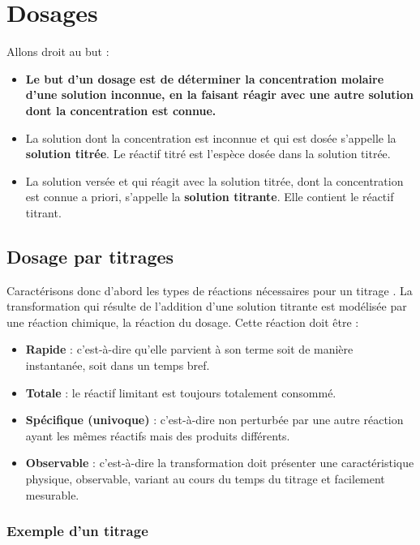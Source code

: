 \documentclass[11pt,a4paper]{article}
\begin{document}
\section{Dosages}

Allons droit au but : 
\begin{itemize}
    \item \textbf{Le but d’un dosage est de déterminer la concentration molaire d’une solution inconnue, en la faisant réagir avec une autre solution dont la concentration est connue.}
    \item La solution dont la concentration est inconnue et qui est dosée s’appelle la \textbf{solution titrée}. Le réactif titré est l’espèce dosée dans la solution titrée. 
    \item La solution versée et qui réagit avec la solution titrée, dont la concentration est connue a priori, s’appelle la \textbf{solution titrante}. Elle contient le réactif titrant.
\end{itemize}

\subsection{Dosage par titrages}

Caractérisons donc d’abord les types de réactions nécessaires pour un titrage  . La transformation qui résulte de l’addition d’une solution titrante est modélisée par une réaction chimique, la réaction du dosage.  Cette réaction doit être :

\begin{itemize}
    \item \textbf{Rapide} : c'est-à-dire qu’elle parvient à son terme soit de manière instantanée, soit dans un temps bref.
    \item \textbf{Totale} : le réactif limitant est toujours totalement consommé.
    \item \textbf{Spécifique (univoque)} : c'est-à-dire non perturbée par une autre réaction ayant les mêmes réactifs mais des produits différents. 
    \item \textbf{Observable} : c'est-à-dire la transformation doit présenter une caractéristique physique, observable, variant au cours du temps du titrage et facilement mesurable.
\end{itemize}

\subsubsection{Exemple d'un titrage}
\end{document}

